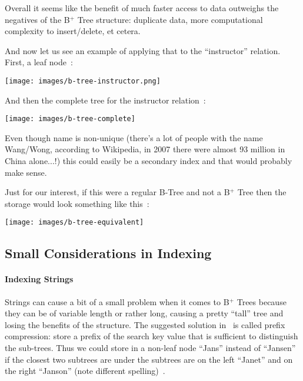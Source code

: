 \documentclass[a4paper]{report}
\begin{document}
Overall it seems like the benefit of much faster access to data outweighs the negatives of the B$^{+}$ Tree structure: duplicate data, more computational complexity to insert/delete, et cetera.

And now let us see an example of applying that to the ``instructor'' relation. First, a leaf node~\cite{dsc}:

\begin{center}
	\texttt{[image: images/b-tree-instructor.png]}
\end{center}

And then the complete tree for the instructor relation~\cite{dsc}:

\begin{center}
	\texttt{[image: images/b-tree-complete]}
\end{center}

Even though name is non-unique (there's a lot of people with the name Wang/Wong, according to Wikipedia, in 2007 there were almost 93 million in China alone...!) this could easily be a secondary index and that would probably make sense.

Just for our interest, if this were a regular B-Tree and not a B$^{+}$ Tree then the storage would look something like this~\cite{dsc}:

\begin{center}
	\texttt{[image: images/b-tree-equivalent]}
\end{center}

\subsection*{Small Considerations in Indexing}

\paragraph{Indexing Strings}
Strings can cause a bit of a small problem when it comes to B$^{+}$ Trees because they can be of variable length or rather long, causing a pretty ``tall'' tree and losing the benefits of the structure. The suggested solution in~\cite{dsc} is called prefix compression: store a prefix of the search key value that is sufficient to distinguish the sub-trees. Thus we could store in a non-leaf node ``Jans'' instead of ``Jansen'' if the closest two subtrees are under the subtrees are on the left ``Janet'' and on the right ``Janson'' (note different spelling)~\cite{dsc}.
\end{document}
